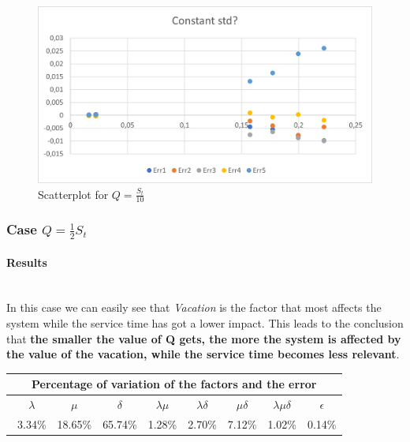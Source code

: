 \documentclass{article}
\begin{document}
                     \begin{figure}[htbp]
                        \centering
                        \includegraphics[scale=0.8]{images/standardDeviation_0,1.png}
                        \caption{Scatterplot for $Q = \frac{S_t}{10}$}
                        \label{fig:standardDeviation_0,1}
                    \end{figure}
                
        \newpage
        
        \subsubsection{Case $Q = \frac{1}{2} S_t$}
            
                \paragraph{Results} \hfill \\
                In this case we can easily see that \textit{Vacation} is the factor that most affects the system while the service time has got a lower impact. This leads to the conclusion that \textbf{the smaller the value of Q gets, the more the system is affected by the value of the vacation, while the service time becomes less relevant}.

                    \begin{table}[htbp]
                        \centering 
                        \begin{tabular}{|c|c|c|c|c|c|c|c|}
                            \hline
                            \multicolumn{8}{|c|}{\bf Percentage of variation of the factors and the error} \\
                            \hline
                            \ $\lambda$ & $\mu$ & $\delta$ & $\lambda\mu$ & $\lambda\delta$ & $\mu\delta$ & $\lambda\mu\delta$ & $\epsilon$ \\
                            \hline
                            \ 3.34\% & 18.65\% & 65.74\% & 1.28\% & 2.70\% & 7.12\% & 1.02\% & 0.14\% \\ 
                            \hline
                        \end{tabular}
                        \label{table:variation_0,5}
                    \end{table}
                    
\end{document}
